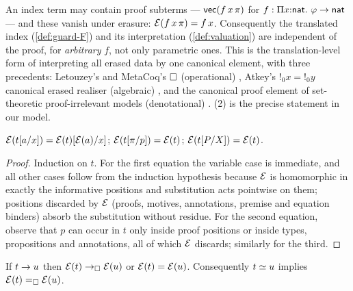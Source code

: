 \begin{remark}
\label{rem:proof-indices}
An index term may contain proof subterms --- $\mathsf{vec}(f\,x\,\pi)$ for $f :
\Pi x{:}\mathsf{nat}.\ \varphi \to \mathsf{nat}$ --- and these vanish under erasure:
$\mathcal{E}(f\,x\,\pi) = f\,x$.  Consequently the translated index
(\cref{def:guard-F}) and its interpretation
(\cref{def:valuation}) are independent of the proof, for \emph{arbitrary}
$f$, not only parametric ones.  This is the translation-level form of
interpreting all erased data by one canonical element, with three
precedents: Letouzey's and MetaCoq's $\square$ (operational)
\cite{Letouzey2003,SozeauEtAl2020}, Atkey's $!_0 x = {!}_0 y$ canonical
erased realiser (algebraic) \cite{Atkey2018}, and the canonical proof
element of set-theoretic proof-irrelevant models (denotational)
\cite{LeeWerner2011}.  (2) is the precise statement
in our model.
\end{remark}

\begin{lemma}
\label{lem:erase-subst}
$\mathcal{E}(t[a/x]) = \mathcal{E}(t)[\mathcal{E}(a)/x]$;\quad
$\mathcal{E}(t[\pi/p]) = \mathcal{E}(t)$;\quad
$\mathcal{E}(t[P/X]) = \mathcal{E}(t)$.
\end{lemma}

\begin{proof}
Induction on $t$.  For the first equation the variable case is
immediate, and all other cases follow from the induction hypothesis
because $\mathcal{E}$ is homomorphic in exactly the informative positions
and substitution acts pointwise on them; positions discarded by
$\mathcal{E}$ (proofs, motives, annotations, premise and equation binders)
absorb the substitution without residue.  For the second equation,
observe that $p$ can occur in $t$ only inside proof positions or inside
types, propositions and annotations, all of which $\mathcal{E}$ discards;
similarly for the third.
\end{proof}

\begin{lemma}
\label{lem:erase-sim}
If $t \rightarrow u$ then $\mathcal{E}(t) \rightarrow_{\square} \mathcal{E}(u)$ or $\mathcal{E}(t) =
\mathcal{E}(u)$.  Consequently $t \simeq u$ implies $\mathcal{E}(t) =_{\square}
\mathcal{E}(u)$.
\end{lemma}

